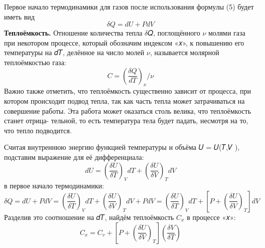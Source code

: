 \documentclass[12pt]{article}
\begin{document}
    Первое начало термодинамики для газов после использования
    формулы (5) будет иметь вид
    \begin{equation}
    \delta Q = dU + PdV
    \end{equation}
    \textbf{Теплоёмкость.} Отношение количества тепла $\delta$𝑄, поглощённого
    $\nu$ молями газа при некотором процессе, который обозначим индексом «𝑥», к повышению его температуры на 𝑑𝑇, делённое на
    число молей $\nu$, называется молярной теплоёмкостью газа:
    \begin{equation}
    C = \left(\frac{\delta Q}{dT} \right)_x / \nu
    \end{equation}
    Важно также отметить, что теплоёмкость существенно зависит
    от процесса, при котором происходит подвод тепла, так как часть
    тепла может затрачиваться на совершение работы. Эта работа
    может оказаться столь велика, что теплоёмкость станет отрица-
    тельной, то есть температура тела будет падать, несмотря на то,
    что тепло подводится.
    
    Считая внутреннюю энергию функцией температуры и объёма
    𝑈 = 𝑈(𝑇,𝑉 ), подставим выражение для её дифференциала: $$dU = \left(\frac{\delta U}{\delta T} \right)_VdT + \left(\frac{\delta U}{\delta V} \right)_TdV$$
    в первое начало термодинамики:$$\delta Q = dU + PdV = \left(\frac{\delta U}{\delta T} \right)_VdT + \left(\frac{\delta U}{\delta V} \right)_TdV + PdV = \left(\frac{\delta U}{\delta T} \right)_VdT + \left[P +\left(\frac{\delta U}{\delta V} \right)_T \right] dV$$
    Разделив это соотношение на 𝑑𝑇, найдём теплоёмкость $𝐶_𝑥$ в процессе «𝑥»:
    \begin{equation}
    C_x = C_v + \left[P +\left(\frac{\delta U}{\delta V} \right)_T \right]
    \left(\frac{\delta V}{\delta T} \right)
    \end{equation}
    
\end{document}
